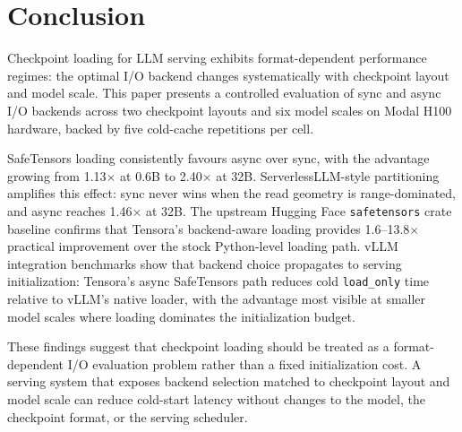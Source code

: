 \section{Conclusion}
\label{sec:conclusion}

Checkpoint loading for LLM serving exhibits format-dependent performance regimes: the optimal I/O backend changes systematically with checkpoint layout and model scale. This paper presents a controlled evaluation of sync and async I/O backends across two checkpoint layouts and six model scales on Modal H100 hardware, backed by five cold-cache repetitions per cell.

SafeTensors loading consistently favours async over sync, with the advantage growing from 1.13$\times$ at 0.6B to 2.40$\times$ at 32B. ServerlessLLM-style partitioning amplifies this effect: sync never wins when the read geometry is range-dominated, and async reaches 1.46$\times$ at 32B. The upstream Hugging Face \texttt{safetensors} crate baseline confirms that Tensora's backend-aware loading provides 1.6--13.8$\times$ practical improvement over the stock Python-level loading path. vLLM integration benchmarks show that backend choice propagates to serving initialization: Tensora's async SafeTensors path reduces cold \texttt{load\_only} time relative to vLLM's native loader, with the advantage most visible at smaller model scales where loading dominates the initialization budget.

These findings suggest that checkpoint loading should be treated as a format-dependent I/O evaluation problem rather than a fixed initialization cost. A serving system that exposes backend selection matched to checkpoint layout and model scale can reduce cold-start latency without changes to the model, the checkpoint format, or the serving scheduler.
